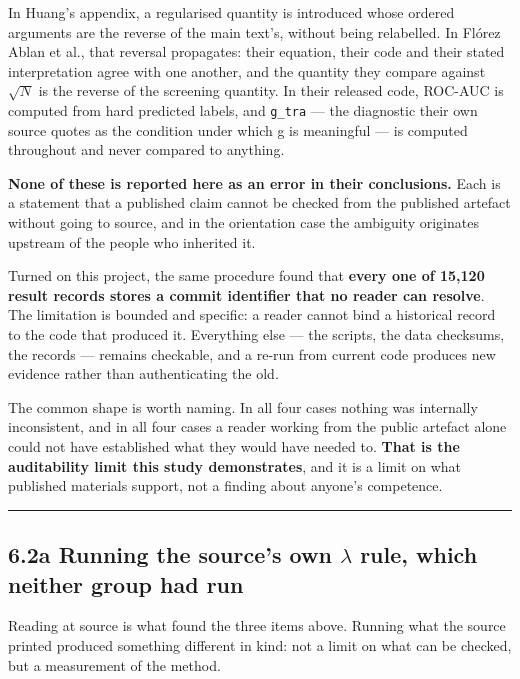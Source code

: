 \documentclass[
  10pt,
]{article}
\begin{document}
In Huang's appendix, a regularised quantity is introduced whose ordered
arguments are the reverse of the main text's, without being relabelled.
In Flórez Ablan et al., that reversal propagates: their equation, their
code and their stated interpretation agree with one another, and the
quantity they compare against \(\sqrt{N}\) is the reverse of the
screening quantity. In their released code, ROC-AUC is computed from
hard predicted labels, and \texttt{g\_\allowbreak{}tra} --- the diagnostic their own
source quotes as the condition under which g is meaningful --- is
computed throughout and never compared to anything.

\textbf{None of these is reported here as an error in their
conclusions.} Each is a statement that a published claim cannot be
checked from the published artefact without going to source, and in the
orientation case the ambiguity originates upstream of the people who
inherited it.

Turned on this project, the same procedure found that \textbf{every one
of 15,120 result records stores a commit identifier that no reader can
resolve}. The limitation is bounded and specific: a reader cannot bind a
historical record to the code that produced it. Everything else --- the
scripts, the data checksums, the records --- remains checkable, and a
re-run from current code produces new evidence rather than
authenticating the old.

The common shape is worth naming. In all four cases nothing was
internally inconsistent, and in all four cases a reader working from the
public artefact alone could not have established what they would have
needed to. \textbf{That is the auditability limit this study
demonstrates}, and it is a limit on what published materials support,
not a finding about anyone's competence.

\begin{center}\rule{0.5\linewidth}{0.5pt}\end{center}

\subsection{\texorpdfstring{6.2a Running the source's own \(\lambda\)
rule, which neither group had
run}{6.2a Running the source's own \textbackslash lambda rule, which neither group had run}}\label{a-running-the-sources-own-lambda-rule-which-neither-group-had-run}

Reading at source is what found the three items above. Running what the
source printed produced something different in kind: not a limit on what
can be checked, but a measurement of the method.
\end{document}
